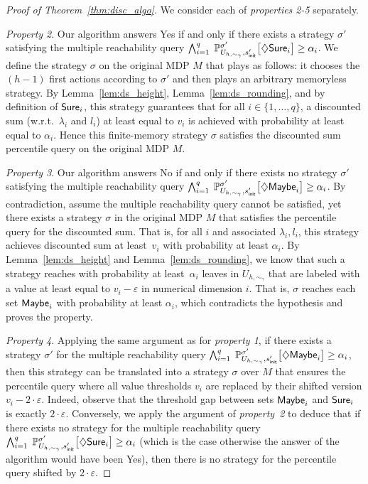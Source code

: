 \documentclass{llncs}
\newcommand{\initState}{\ensuremath{s_{{\sf init}}} }
\newcommand{\strat}{\ensuremath{\sigma} }
\newcommand*{\pr}{\mathbb{P}}
\newcommand{\discount}{\ensuremath{\lambda} }
\begin{document}
\begin{proof}[Proof of Theorem~\ref{thm:disc_algo}] We consider each of \textit{properties 2-5} separately.

\textit{Property 2}. Our algorithm answers \textsf{Yes} if and only if there exists a strategy $\strat'$ satisfying the multiple reachability query $\bigwedge_{i = 1}^{q}\; \pr_{U_{h,\sim_{\gamma}},\initState'}^{\strat'}\big[\diamondsuit {\sf Sure}_{i}\big] \geq
	\alpha_i$. We define the strategy $\strat$ on the original MDP $M$ that plays as follows: it chooses the $(h-1)$ first actions according to $\strat'$ and then plays an arbitrary memoryless strategy. By Lemma~\ref{lem:ds_height}, Lemma~\ref{lem:ds_rounding}, and by definition of ${\sf Sure}_{i}$, this strategy guarantees that for all $i \in \{1, \ldots{}, q\}$, a discounted sum (w.r.t.~$\discount_{i}$ and $l_{i}$) at least equal to $v_{i}$ is achieved with probability at least equal to $\alpha_{i}$. Hence this finite-memory strategy $\strat$ satisfies the discounted sum percentile query on the original MDP $M$.
	
\textit{Property 3}. Our algorithm answers \textsf{No} if and only if there exists no strategy $\strat'$ satisfying the multiple reachability query $\bigwedge_{i = 1}^{q}\; \pr_{U_{h,\sim_{\gamma}},\initState'}^{\strat'}\big[\diamondsuit {\sf Maybe}_{i}\big] \geq
	\alpha_i$. By contradiction, assume the multiple reachability query cannot be satisfied, yet there exists a strategy $\strat$ in the original MDP $M$ that satisfies the percentile query for the discounted sum. That is, for all $i$ and associated $\discount_{i}, l_{i}$, this strategy achieves discounted sum at least~$v_{i}$ with probability at least $\alpha_{i}$. By Lemma~\ref{lem:ds_height} and Lemma~\ref{lem:ds_rounding}, we know that such a strategy reaches with probability at least~$\alpha_{i}$ leaves in $U_{h,\sim_{\gamma}}$ that are labeled with a value at least equal to $v_{i} - \varepsilon$ in numerical dimension $i$. That is, $\strat$ reaches each set ${\sf Maybe}_{i}$ with probability at least $\alpha_{i}$, which contradicts the hypothesis and proves the property.

\textit{Property 4}. Applying the same argument as for \textit{property 1}, if there exists a strategy $\strat'$ for the multiple reachability query $\bigwedge_{i = 1}^{q}\; \pr_{U_{h,\sim_{\gamma}},\initState'}^{\strat'}\big[\diamondsuit {\sf Maybe}_{i}\big] \geq
	\alpha_i$, then this strategy can be translated into a strategy $\strat$ over $M$ that ensures the percentile query where all value thresholds $v_{i}$ are replaced by their shifted version $v_{i} - 2\cdot \varepsilon$. Indeed, observe that the threshold gap between sets ${\sf Maybe}_{i}$ and ${\sf Sure}_{i}$ is exactly $2\cdot\varepsilon$. Conversely, we apply the argument of \textit{property~2} to deduce that if there exists no strategy for the multiple reachability query $\bigwedge_{i = 1}^{q}\; \pr_{U_{h,\sim_{\gamma}},\initState'}^{\strat'}\big[\diamondsuit {\sf Sure}_{i}\big] \geq
	\alpha_i$ (which is the case otherwise the answer of the algorithm would have been \textsf{Yes}), then there is no strategy for the percentile query shifted by $2\cdot\varepsilon$. 


\end{proof}
\end{document}
